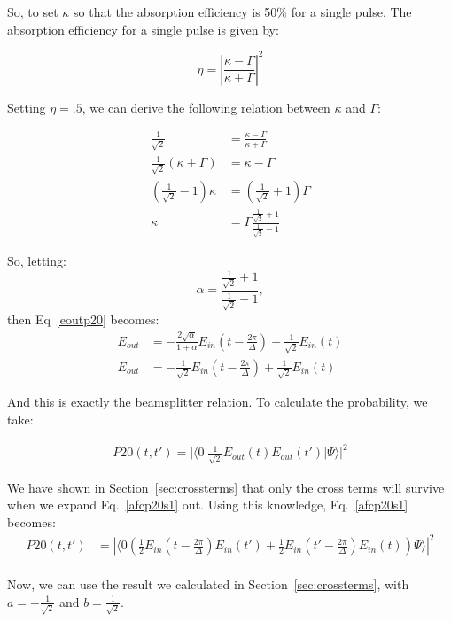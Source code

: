 \documentclass[12pt]{article}
\begin{document}
So, to set $\kappa$ so that the absorption efficiency is 50\% for a single pulse. The absorption efficiency
for a single pulse is given by:

\begin{equation}
\eta = |\frac{\kappa-\Gamma}{\kappa+\Gamma}|^2
\end{equation}

Setting $\eta = .5$, we can derive the following relation between $\kappa$ and $\Gamma$:

\begin{align}
\frac{1}{\sqrt{2}} &= \frac{\kappa- \Gamma}{\kappa+\Gamma} \\
\frac{1}{\sqrt{2}} (\kappa +\Gamma) &= \kappa - \Gamma \\
(\frac{1}{\sqrt{2}}-1) \kappa &= (\frac{1}{\sqrt{2}}+1)\Gamma\\
\kappa &= \Gamma \frac{\frac{1}{\sqrt{2}}+1}{\frac{1}{\sqrt{2}}-1}  
\end{align}

So, letting:
\begin{equation}
\label{kappagamma}
\alpha = \frac{\frac{1}{\sqrt{2}}+1}{\frac{1}{\sqrt{2}}-1},
\end{equation}
then Eq~\eqref{eoutp20} becomes:
\begin{align}
E_{out} &= -\frac{2 \sqrt{\alpha}}{1+\alpha} E_{in}(t-\frac{2\pi}{\Delta}) + \frac{1}{\sqrt{2}} E_{in}(t)\\
E_{out} &=- \frac{1}{\sqrt{2}} E_{in}(t-\frac{2 \pi}{\Delta}) + \frac{1}{\sqrt{2}} E_{in}(t)
\end{align}

And this is exactly the beamsplitter relation. To calculate the probability, we take:

\begin{align}
\label{afcp20s1}
P20(t,t') = | \langle 0 |\frac{1}{\sqrt{2}} E_{out}(t) E_{out}(t') | \Psi \rangle |^2
\end{align}

We have shown in Section~\ref{sec:crossterms} that only the cross terms will survive when we expand Eq.~\eqref{afcp20s1} out. Using this knowledge, Eq.~\eqref{afcp20s1} becomes:
\begin{align}
P20(t,t') &= \left|\langle 0\left(\frac{1}{2} E_{in}(t-\frac{2 \pi}{\Delta})E_{in}(t')+\frac{1}{2} E_{in}(t'-\frac{2 \pi}{\Delta})E_{in}(t) \right)\Psi \rangle\right|^2  \\
\end{align}

Now, we can use the result we calculated in Section~\ref{sec:crossterms}, with $a =- \frac{1}{\sqrt{2}}$ and $b = \frac{1}{\sqrt{2}}$. 
\end{document}
